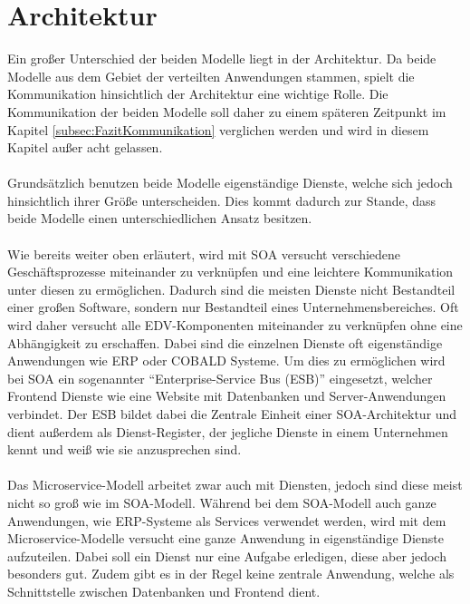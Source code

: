 \section{Architektur}
\label{sec:FazitArchitektur}
Ein großer Unterschied der beiden Modelle liegt in der Architektur. Da beide Modelle aus dem Gebiet der verteilten Anwendungen stammen, spielt die Kommunikation hinsichtlich der Architektur eine wichtige Rolle. Die Kommunikation der beiden Modelle soll daher zu einem späteren Zeitpunkt im Kapitel \ref{subsec:FazitKommunikation}  verglichen werden und wird in diesem Kapitel außer acht gelassen.
\\\\
Grundsätzlich benutzen beide Modelle eigenständige Dienste, welche sich jedoch hinsichtlich ihrer Größe unterscheiden. Dies kommt dadurch zur Stande, dass beide Modelle einen unterschiedlichen Ansatz besitzen.
\\\\
Wie bereits weiter oben erläutert, wird mit SOA versucht verschiedene Geschäftsprozesse miteinander zu verknüpfen und eine leichtere Kommunikation unter diesen zu ermöglichen. Dadurch sind die meisten Dienste nicht  Bestandteil einer großen Software, sondern nur Bestandteil eines Unternehmensbereiches. Oft wird daher versucht alle EDV-Komponenten miteinander zu verknüpfen ohne eine Abhängigkeit zu erschaffen. Dabei sind die einzelnen Dienste oft eigenständige Anwendungen wie ERP oder COBALD Systeme. Um dies zu ermöglichen wird bei SOA ein sogenannter "`Enterprise-Service Bus (ESB)"' eingesetzt, welcher Frontend Dienste wie eine Website mit Datenbanken und Server-Anwendungen verbindet. Der ESB bildet dabei die Zentrale Einheit einer SOA-Architektur und dient außerdem als Dienst-Register, der jegliche Dienste in einem Unternehmen kennt und weiß wie sie anzusprechen sind.
\\\\
Das Microservice-Modell arbeitet zwar auch mit Diensten, jedoch sind diese meist nicht so groß wie im SOA-Modell. Während bei dem SOA-Modell auch ganze Anwendungen, wie ERP-Systeme als Services verwendet werden, wird mit dem Microservice-Modelle versucht eine ganze Anwendung in eigenständige  Dienste aufzuteilen. Dabei soll ein Dienst nur eine Aufgabe erledigen, diese aber jedoch besonders gut. Zudem gibt es in der Regel keine zentrale Anwendung, welche als Schnittstelle zwischen Datenbanken und Frontend dient.

